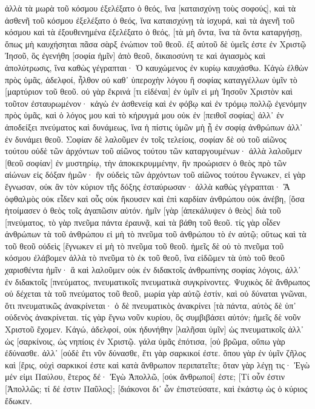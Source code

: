 ἀλλὰ τὰ μωρὰ τοῦ κόσμου ἐξελέξατο ὁ θεός, ἵνα [καταισχύνῃ τοὺς σοφούς], καὶ τὰ ἀσθενῆ τοῦ κόσμου ἐξελέξατο ὁ θεός, ἵνα καταισχύνῃ τὰ ἰσχυρά, 
καὶ τὰ ἀγενῆ τοῦ κόσμου καὶ τὰ ἐξουθενημένα ἐξελέξατο ὁ θεός, [τὰ μὴ ὄντα, ἵνα τὰ ὄντα καταργήσῃ, 
ὅπως μὴ καυχήσηται πᾶσα σὰρξ ἐνώπιον τοῦ θεοῦ. 
ἐξ αὐτοῦ δὲ ὑμεῖς ἐστε ἐν Χριστῷ Ἰησοῦ, ὃς ἐγενήθη [σοφία ἡμῖν] ἀπὸ θεοῦ, δικαιοσύνη τε καὶ ἁγιασμὸς καὶ ἀπολύτρωσις, 
ἵνα καθὼς γέγραπται· Ὁ καυχώμενος ἐν κυρίῳ καυχάσθω. 
Κἀγὼ ἐλθὼν πρὸς ὑμᾶς, ἀδελφοί, ἦλθον οὐ καθ᾽ ὑπεροχὴν λόγου ἢ σοφίας καταγγέλλων ὑμῖν τὸ [μαρτύριον τοῦ θεοῦ. 
οὐ γὰρ ἔκρινά [τι εἰδέναι] ἐν ὑμῖν εἰ μὴ Ἰησοῦν Χριστὸν καὶ τοῦτον ἐσταυρωμένον· 
κἀγὼ ἐν ἀσθενείᾳ καὶ ἐν φόβῳ καὶ ἐν τρόμῳ πολλῷ ἐγενόμην πρὸς ὑμᾶς, 
καὶ ὁ λόγος μου καὶ τὸ κήρυγμά μου οὐκ ἐν [πειθοῖ σοφίας] ἀλλ᾽ ἐν ἀποδείξει πνεύματος καὶ δυνάμεως, 
ἵνα ἡ πίστις ὑμῶν μὴ ᾖ ἐν σοφίᾳ ἀνθρώπων ἀλλ᾽ ἐν δυνάμει θεοῦ. 
Σοφίαν δὲ λαλοῦμεν ἐν τοῖς τελείοις, σοφίαν δὲ οὐ τοῦ αἰῶνος τούτου οὐδὲ τῶν ἀρχόντων τοῦ αἰῶνος τούτου τῶν καταργουμένων· 
ἀλλὰ λαλοῦμεν [θεοῦ σοφίαν] ἐν μυστηρίῳ, τὴν ἀποκεκρυμμένην, ἣν προώρισεν ὁ θεὸς πρὸ τῶν αἰώνων εἰς δόξαν ἡμῶν· 
ἣν οὐδεὶς τῶν ἀρχόντων τοῦ αἰῶνος τούτου ἔγνωκεν, εἰ γὰρ ἔγνωσαν, οὐκ ἂν τὸν κύριον τῆς δόξης ἐσταύρωσαν· 
ἀλλὰ καθὼς γέγραπται· Ἃ ὀφθαλμὸς οὐκ εἶδεν καὶ οὖς οὐκ ἤκουσεν καὶ ἐπὶ καρδίαν ἀνθρώπου οὐκ ἀνέβη, [ὅσα ἡτοίμασεν ὁ θεὸς τοῖς ἀγαπῶσιν αὐτόν. 
ἡμῖν [γὰρ [ἀπεκάλυψεν ὁ θεὸς] διὰ τοῦ [πνεύματος, τὸ γὰρ πνεῦμα πάντα ἐραυνᾷ, καὶ τὰ βάθη τοῦ θεοῦ. 
τίς γὰρ οἶδεν ἀνθρώπων τὰ τοῦ ἀνθρώπου εἰ μὴ τὸ πνεῦμα τοῦ ἀνθρώπου τὸ ἐν αὐτῷ; οὕτως καὶ τὰ τοῦ θεοῦ οὐδεὶς [ἔγνωκεν εἰ μὴ τὸ πνεῦμα τοῦ θεοῦ. 
ἡμεῖς δὲ οὐ τὸ πνεῦμα τοῦ κόσμου ἐλάβομεν ἀλλὰ τὸ πνεῦμα τὸ ἐκ τοῦ θεοῦ, ἵνα εἰδῶμεν τὰ ὑπὸ τοῦ θεοῦ χαρισθέντα ἡμῖν· 
ἃ καὶ λαλοῦμεν οὐκ ἐν διδακτοῖς ἀνθρωπίνης σοφίας λόγοις, ἀλλ᾽ ἐν διδακτοῖς [πνεύματος, πνευματικοῖς πνευματικὰ συγκρίνοντες. 
Ψυχικὸς δὲ ἄνθρωπος οὐ δέχεται τὰ τοῦ πνεύματος τοῦ θεοῦ, μωρία γὰρ αὐτῷ ἐστίν, καὶ οὐ δύναται γνῶναι, ὅτι πνευματικῶς ἀνακρίνεται· 
ὁ δὲ πνευματικὸς ἀνακρίνει [τὰ πάντα, αὐτὸς δὲ ὑπ᾽ οὐδενὸς ἀνακρίνεται. 
τίς γὰρ ἔγνω νοῦν κυρίου, ὃς συμβιβάσει αὐτόν; ἡμεῖς δὲ νοῦν Χριστοῦ ἔχομεν. 
Κἀγώ, ἀδελφοί, οὐκ ἠδυνήθην [λαλῆσαι ὑμῖν] ὡς πνευματικοῖς ἀλλ᾽ ὡς [σαρκίνοις, ὡς νηπίοις ἐν Χριστῷ. 
γάλα ὑμᾶς ἐπότισα, [οὐ βρῶμα, οὔπω γὰρ ἐδύνασθε. ἀλλ᾽ [οὐδὲ ἔτι νῦν δύνασθε, 
ἔτι γὰρ σαρκικοί ἐστε. ὅπου γὰρ ἐν ὑμῖν ζῆλος καὶ [ἔρις, οὐχὶ σαρκικοί ἐστε καὶ κατὰ ἄνθρωπον περιπατεῖτε; 
ὅταν γὰρ λέγῃ τις· Ἐγὼ μέν εἰμι Παύλου, ἕτερος δέ· Ἐγὼ Ἀπολλῶ, [οὐκ ἄνθρωποί] ἐστε; 
[Τί οὖν ἐστιν [Ἀπολλῶς; τί δέ ἐστιν Παῦλος]; [διάκονοι δι᾽ ὧν ἐπιστεύσατε, καὶ ἑκάστῳ ὡς ὁ κύριος ἔδωκεν. 
